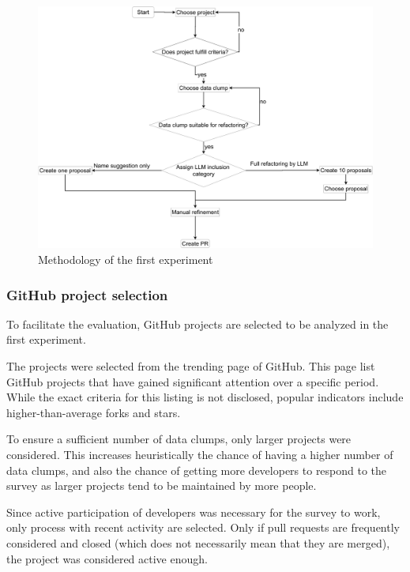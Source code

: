 \begin{figure}[ht!]
    \centering
    \includegraphics[width=1\columnwidth]{figures/chapter5/flowchart_expA.drawio.pdf}
    \caption{Methodology of the first experiment}
    \label{fig:flowchart_expA}
\end{figure}

\subsubsection{GitHub project selection}\label{sec:github_projects}

To facilitate the evaluation, GitHub projects are selected to be analyzed in the first experiment. 


The projects were selected from the trending page of GitHub. This page list GitHub projects that have gained significant attention over a specific  period. While the exact criteria for this listing is not disclosed, popular indicators include higher-than-average forks and stars.

To ensure a sufficient number of data clumps, only larger projects were considered. This increases heuristically the chance of having a higher number of data clumps, and also the chance of getting more developers to respond to the survey as larger projects tend to be maintained by more people. 

Since active participation of developers was necessary for the survey to work, only process with recent activity are selected. Only if pull requests are frequently considered and closed (which does not necessarily mean that they are merged), the project was considered active enough. 

